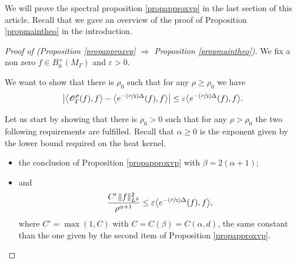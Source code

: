 \documentclass[10pt]{amsart}
\let\mathcal\mathscr
\let\epsilon\varepsilon
\newcommand{\Psfrac}[2]{(\sfrac{#1}{#2})}
\theoremstyle{plain}
\theoremstyle{definition}
\begin{document}
We will prove the spectral proposition \ref{propapproxvp} in the last section of this article. Recall that we gave an overview of the proof of Proposition \ref{propmaintheo} in the introduction.

\begin{proof}[Proof of (Proposition \ref{propapproxvp}
$\Rightarrow$ Proposition \ref{propmaintheo})]
We fix a non zero $f \in B^+_0(M_{\Gamma})$ and $\epsilon>0$.

We want to show that there is $\rho_0$ such that for any $\rho \ge \rho_0$ we have
\begin{equation}
\label{equation11}
\bigl| \bigl< \mathcal{O}_{\Gamma}^{\rho}(f), f \bigr> - \bigl< e^{- \Psfrac{\rho}{2} \Delta}(f), f \bigr> \bigr| \le \epsilon \bigl< e^{- \Psfrac{\rho}{2} \Delta}(f), f \bigr>.
\end{equation}

Let us start by showing that there is $\rho_0 > 0$ such that for any $\rho > \rho_0$ the two following requirements are fulfilled. Recall that $\alpha \ge 0$ is the exponent given by the lower bound required on the heat kernel.
\begin{itemize}
\item the conclusion of Proposition \ref{propapproxvp} with $\beta = 2 (\alpha +1)$;
\item and
\[
\frac{ C' \, \|f\|^2_{L^2}}{\rho^{\alpha + 1}} \le \epsilon \bigl< e^{- \Psfrac{\rho }{2} \Delta}(f), f \bigr>,
\]
where $C' = \max(1,C)$ with $C = C(\beta) = C(\alpha, d)$, the same constant than the one given by the second item of Proposition \ref{propapproxvp}.
\end{itemize}


\end{proof}
\end{document}
